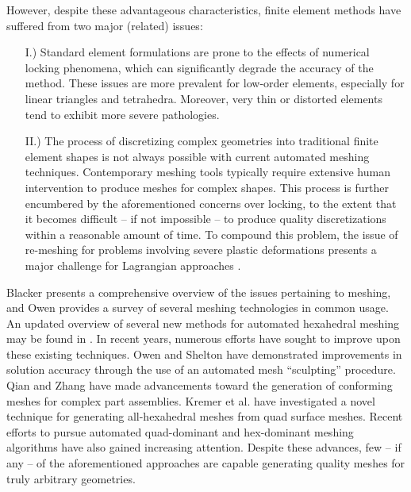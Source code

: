 	However, despite these advantageous characteristics, finite element methods have suffered from two major (related) issues:
	\begin{itemize}
		\item[I.)] Standard element formulations are prone to the effects of numerical locking phenomena, which can significantly degrade the accuracy of the method. These issues are more prevalent for low-order elements, especially for linear triangles and tetrahedra. Moreover, very thin or distorted elements tend to exhibit more severe pathologies.
		\item[II.)] The process of discretizing complex geometries into traditional finite element shapes is not always possible with current automated meshing techniques. Contemporary meshing tools typically require extensive human intervention to produce meshes for complex shapes. This process is further encumbered by the aforementioned concerns over locking, to the extent that it becomes difficult -- if not impossible -- to produce quality discretizations within a reasonable amount of time. To compound this problem, the issue of re-meshing for problems involving severe plastic deformations presents a major challenge for Lagrangian approaches \cite{Hattangady:99}.
	\end{itemize}
	
	Blacker \cite{Blacker:00} presents a comprehensive overview of the issues pertaining to meshing, and Owen \cite{Owen:14} provides a survey of several meshing technologies in common usage. An updated overview of several new methods for automated hexahedral meshing may be found in \cite{Staten:07}. In recent years, numerous efforts have sought to improve upon these existing techniques. Owen and Shelton \cite{Owen:14} have demonstrated improvements in solution accuracy through the use of an automated mesh ``sculpting'' procedure. Qian and Zhang \cite{Qian:12} have made advancements toward the generation of conforming meshes for complex part assemblies. Kremer et al. \cite{Kremer:14} have investigated a novel technique for generating all-hexahedral meshes from quad surface meshes. Recent efforts to pursue automated quad-dominant \cite{Remacle:12} and hex-dominant \cite{Xifeng:17} meshing algorithms have also gained increasing attention. Despite these advances, few -- if any -- of the aforementioned approaches are capable generating quality meshes for truly arbitrary geometries.
	

